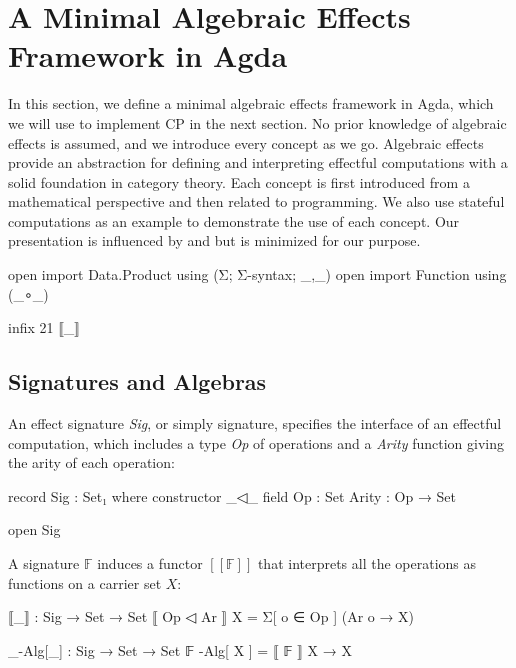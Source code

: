 \section{A Minimal Algebraic Effects Framework in Agda}

In this section, we define a minimal algebraic effects framework in Agda, which we will use to implement CP in the next section.
%
No prior knowledge of algebraic effects is assumed, and we introduce every concept as we go.
%
Algebraic effects provide an abstraction for defining and interpreting effectful computations with a solid foundation in category theory.
%
Each concept is first introduced from a mathematical perspective and then related to programming.
%
We also use stateful computations as an example to demonstrate the use of each concept.
%
Our presentation is influenced by \citet{bauer-2019} and \citet{kidney-2023} but is minimized for our purpose.

\begin{code}[hide]
open import Data.Product using (Σ; Σ-syntax; _,_)
open import Function using (_∘_)

infix 21 ⟦_⟧
\end{code}

\subsection{Signatures and Algebras}

An effect signature \textit{Sig}, or simply signature, specifies the interface of an effectful computation, which includes a type \textit{Op} of operations and a \textit{Arity} function giving the arity of each operation:
%
\begin{center}\begin{code}
record Sig : Set₁ where
  constructor _◁_
  field
    Op : Set
    Arity : Op → Set
\end{code}\end{center}
%
\begin{code}[hide]
open Sig
\end{code}

A signature $\mathbb{F}$ induces a functor $[\![ \mathbb{F} ]\!]$ that interprets all the operations as functions on a carrier set $X$:
%
\begin{center}\begin{code}
⟦_⟧ : Sig → Set → Set
⟦ Op ◁ Ar ⟧ X = Σ[ o ∈ Op ] (Ar o → X)

_-Alg[_] : Sig → Set → Set
𝔽 -Alg[ X ] = ⟦ 𝔽 ⟧ X → X
\end{code}\end{center}

